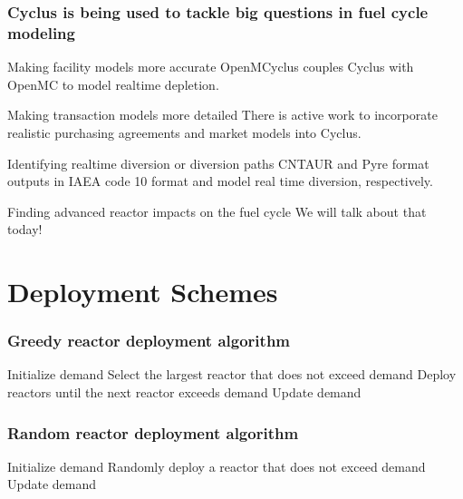 \documentclass[9pt]{beamer}
\begin{document}
  \begin{frame}
    \frametitle{Cyclus is being used to tackle big questions in fuel cycle modeling}
    \begin{block}{Making facility models more accurate}
        OpenMCyclus \cite{openmcyclus_paper} couples Cyclus with OpenMC to model realtime depletion.
    \end{block}
    \begin{block}{Making transaction models more detailed}
        There is active work to incorporate realistic purchasing agreements and market models into Cyclus.
    \end{block}
    \begin{block}{Identifying realtime diversion or diversion paths}
        CNTAUR \cite{mummah_advanced_2024} and Pyre \cite{westphal_modeling_2019} format outputs in IAEA code 10 format and model real time diversion, respectively.
    \end{block}
    \begin{block}{Finding advanced reactor impacts on the fuel cycle}
        We will talk about that today!
    \end{block}
  \end{frame}

  \section{Deployment Schemes}
  \begin{frame}
    \frametitle{Greedy reactor deployment algorithm}
      \begin{algorithmic}[1]
          \State Initialize demand
              \State Select the largest reactor that does not exceed demand
              \State Deploy reactors until the next reactor exceeds demand
              \State Update demand
          \EndWhile
      \end{algorithmic}
  \end{frame}

  \begin{frame}
    \frametitle{Random reactor deployment algorithm}
      \begin{algorithmic}[1]
          \State Initialize demand
              \State Randomly deploy a reactor that does not exceed demand
              \State Update demand
          \EndWhile
      \end{algorithmic}
  \end{frame}
\end{document}
